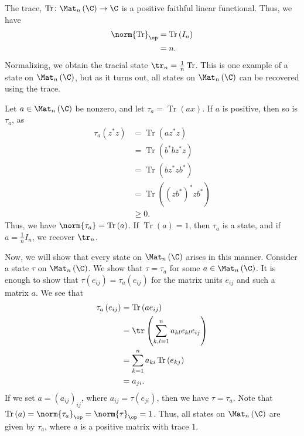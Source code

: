 \documentclass[10pt]{mypackage}
\DeclareMathOperator{\Tr}{Tr}
\begin{document}
\begin{example}
  The trace, $\Tr\colon \Mat_n\left(\C\right)\rightarrow \C$ is a positive faithful linear functional. Thus, we have
  \begin{align*}
    \norm{\Tr}_{\op} &= \Tr\left(I_n\right)\\
                     &= n.
  \end{align*}
  Normalizing, we obtain the tracial state $\tr_n = \frac{1}{n}\Tr$. This is one example of a state on $\Mat_n\left(\C\right)$, but as it turns out, all states on $\Mat_n\left(\C\right)$ can be recovered using the trace.\newline

  Let $a\in \Mat_n\left(\C\right)$ be nonzero, and let $\tau_{a} = \Tr\left(ax\right)$. If $a$ is positive, then so is $\tau_{a}$, as
  \begin{align*}
    \tau_a\left(z^{\ast}z\right) &= \Tr\left(az^{\ast}z\right)\\
                                 &= \Tr\left(b^{\ast}bz^{\ast}z\right)\\
                                 &= \Tr\left(bz^{\ast}zb^{\ast}\right)\\
                                 &= \Tr\left(\left(zb^{\ast}\right)^{\ast}zb^{\ast}\right)\\
                                 &\geq 0.
  \end{align*}
  Thus, we have $\norm{\tau_a} = \Tr\left(a\right)$. If $\Tr\left(a\right) = 1$, then $\tau_a$ is a state, and if $a = \frac{1}{n}I_n$, we recover $\tr_n$.\newline

  Now, we will show that every state on $\Mat_n\left(\C\right)$ arises in this manner. Consider a state $\tau$ on $\Mat_n\left(\C\right)$. We show that $\tau = \tau_a$ for some $a\in \Mat_n\left(\C\right)$. It is enough to show that $\tau\left(e_{ij}\right) = \tau_a\left(e_{ij}\right)$ for the matrix units $e_{ij}$ and such a matrix $a$. We see that
  \begin{align*}
    \tau_a\left(e_{ij}\right) &= \Tr\left(ae_{ij}\right)\\
                              &= \tr\left(\sum_{k,l=1}^{n}a_{kl}e_{kl}e_{ij}\right)\\
                              &= \sum_{k=1}^{n}a_{ki}\Tr\left(e_{kj}\right)\\
                              &= a_{ji}.
  \end{align*}
  If we set $a = \left(a_{ij}\right)_{ij}$, where $a_{ij} = \tau\left(e_{ji}\right)$, then we have $\tau = \tau_{a}$. Note that $\Tr\left(a\right) = \norm{\tau_{a}}_{\op} = \norm{\tau}_{\op} = 1$. Thus, all states on $\Mat_n\left(\C\right)$ are given by $\tau_a$, where $a$ is a positive matrix with trace $1$.
\end{example}
\end{document}
